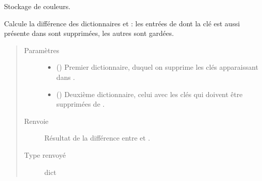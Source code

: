 \documentclass[letterpaper,10pt,french]{sphinxmanual}
\begin{document}
\begin{fulllineitems}
\label{\detokenize{index:DecisionTheoreticTroubleshooting.bcolors}}
Stockage de couleurs.

\end{fulllineitems}


\begin{fulllineitems}
\label{\detokenize{index:DecisionTheoreticTroubleshooting.diff_dicts}}
Calcule la différence des dictionnaires  et  : les entrées de
 dont la clé est aussi présente dans  sont supprimées, les
autres sont gardées.
\begin{quote}\begin{description}
\item[{Paramètres}] \leavevmode\begin{itemize}
\item {} 
 () \textendash{} Premier dictionnaire, duquel on supprime les clés apparaissant dans
.

\item {} 
 () \textendash{} Deuxième dictionnaire, celui avec les clés qui doivent être supprimées
de .

\end{itemize}

\item[{Renvoie}] \leavevmode
{} \textendash{} Résultat de la différence entre  et .

\item[{Type renvoyé}] \leavevmode
dict

\end{description}\end{quote}

\end{fulllineitems}
\end{document}
